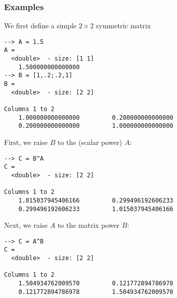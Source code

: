 \subsubsection{Examples}
We first define a simple $2 \times 2$ symmetric matrix
\begin{verbatim}
--> A = 1.5
A =
  <double>  - size: [1 1]
    1.500000000000000
--> B = [1,.2;.2,1]
B =
  <double>  - size: [2 2]
  
Columns 1 to 2
    1.000000000000000         0.200000000000000
    0.200000000000000         1.000000000000000
\end{verbatim}
First, we raise $B$ to the (scalar power) $A$:
\begin{verbatim}
--> C = B^A
C =
  <double>  - size: [2 2]
  
Columns 1 to 2
    1.015037945406166         0.299496192606233
    0.299496192606233         1.015037945406166
\end{verbatim}
Next, we raise $A$ to the matrix power $B$:
\begin{verbatim}
--> C = A^B
C =
  <double>  - size: [2 2]
  
Columns 1 to 2
    1.504934762009570         0.121772894786978
    0.121772894786978         1.504934762009570
\end{verbatim}
